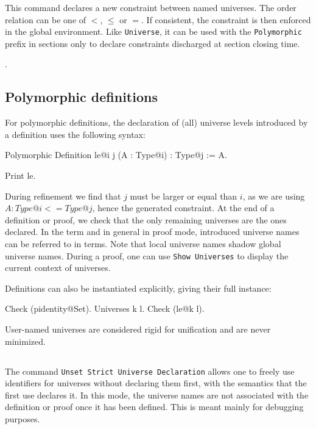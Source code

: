 This command declares a new constraint between named universes.
The order relation can be one of $<$, $\le$ or $=$. If consistent, 
the constraint is then enforced in the global environment. Like
\texttt{Universe}, it can be used with the \texttt{Polymorphic} prefix
in sections only to declare constraints discharged at section closing time.

\begin{ErrMsgs}
\item {}.
\item {}
\end{ErrMsgs}

\subsection{Polymorphic definitions}
For polymorphic definitions, the declaration of (all) universe levels
introduced by a definition uses the following syntax:

\begin{coq_example*}
Polymorphic Definition le@{i j} (A : Type@{i}) : Type@{j} := A.
\end{coq_example*}
\begin{coq_example}
Print le.
\end{coq_example}

During refinement we find that $j$ must be larger or equal than $i$, as
we are using $A : Type@{i} <= Type@{j}$, hence the generated
constraint. At the end of a definition or proof, we check that the only
remaining universes are the ones declared. In the term and in general in
proof mode, introduced universe names can be referred to in
terms. Note that local universe names shadow global universe names.
During a proof, one can use \texttt{Show Universes} to display
the current context of universes.

Definitions can also be instantiated explicitly, giving their full instance:
\begin{coq_example}
Check (pidentity@{Set}).
Universes k l.
Check (le@{k l}).
\end{coq_example}

User-named universes are considered rigid for unification and are never
minimized.

\subsection{}

The command \texttt{Unset Strict Universe Declaration} allows one to
freely use identifiers for universes without declaring them first, with
the semantics that the first use declares it. In this mode, the universe
names are not associated with the definition or proof once it has been
defined. This is meant mainly for debugging purposes.

